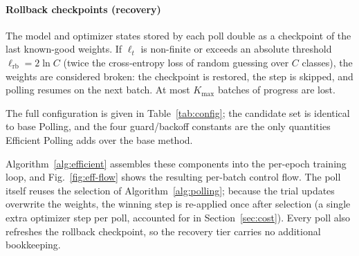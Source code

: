 \documentclass[conference]{IEEEtran}
\begin{document}
\paragraph{Rollback checkpoints (recovery)} The model and optimizer states stored by each poll double as a checkpoint of the last known-good weights. If $\ell_t$ is non-finite or exceeds an absolute threshold $\ell_{\mathrm{rb}} = 2\ln C$ (twice the cross-entropy loss of random guessing over $C$ classes), the weights are considered broken: the checkpoint is restored, the step is skipped, and polling resumes on the next batch. At most $K_{\max}$ batches of progress are lost.

The full configuration is given in Table~\ref{tab:config}; the candidate set is identical to base Polling, and the four guard/backoff constants are the only quantities Efficient Polling adds over the base method.

\begin{table}[htbp]
\caption{Efficient Polling Configuration}
\begin{center}
\end{center}
\label{tab:config}
\end{table}

Algorithm~\ref{alg:efficient} assembles these components into the per-epoch training loop, and Fig.~\ref{fig:eff-flow} shows the resulting per-batch control flow. The poll itself reuses the selection of Algorithm~\ref{alg:polling}; because the trial updates overwrite the weights, the winning step is re-applied once after selection (a single extra optimizer step per poll, accounted for in Section~\ref{sec:cost}). Every poll also refreshes the rollback checkpoint, so the recovery tier carries no additional bookkeeping.
\end{document}
